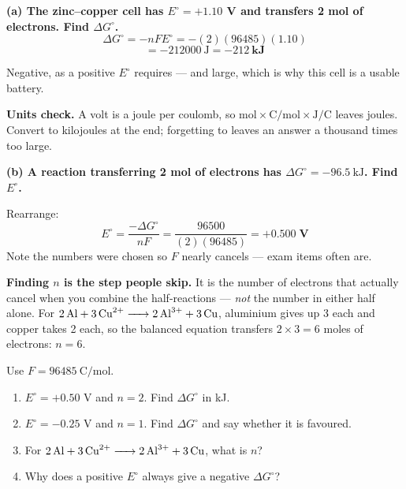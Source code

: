 \documentclass{apchem-worksheet}
\begin{document}
\begin{workedexample}
\textbf{(a) The zinc--copper cell has $E^{\circ} = +1.10$ V and
transfers 2 mol of electrons. Find $\Delta G^{\circ}$.}
\[ \Delta G^{\circ} = -nFE^{\circ}
   = -(2)(96485)(1.10) \]
\[ = \SI{-212000}{\joule} = \mathbf{\SI{-212}{\kilo\joule}} \]

Negative, as a positive $E^{\circ}$ requires --- and large, which is why
this cell is a usable battery.

\textbf{Units check.} A volt is a joule per coulomb, so
$\text{mol} \times \text{C/mol} \times \text{J/C}$ leaves joules.
Convert to kilojoules at the end; forgetting to leaves an answer a
thousand times too large.

\textbf{(b) A reaction transferring 2 mol of electrons has
$\Delta G^{\circ} = \SI{-96.5}{\kilo\joule}$. Find $E^{\circ}$.}

Rearrange:
\[ E^{\circ} = \frac{-\Delta G^{\circ}}{nF}
   = \frac{96500}{(2)(96485)}
   = \mathbf{+0.500\;\text{V}} \]
Note the numbers were chosen so $F$ nearly cancels --- exam items often
are.

\textbf{Finding $n$ is the step people skip.} It is the number of
electrons that actually cancel when you combine the half-reactions ---
\emph{not} the number in either half alone. For
$\ce{2Al + 3Cu^2+ -> 2Al^3+ + 3Cu}$, aluminium gives up 3 each and
copper takes 2 each, so the balanced equation transfers
$2 \times 3 = 6$ moles of electrons: $n = 6$.
\end{workedexample}

\begin{yourturn}
Use $F = \SI{96485}{\coulomb\per\mole}$.
\begin{enumerate}[leftmargin=*,itemsep=0.5em]
  \item $E^{\circ} = +0.50$ V and $n = 2$. Find $\Delta G^{\circ}$ in
        kJ. \workspace[2.0cm]
  \item $E^{\circ} = -0.25$ V and $n = 1$. Find $\Delta G^{\circ}$ and
        say whether it is favoured. \workspace[2.0cm]
  \item For $\ce{2Al + 3Cu^2+ -> 2Al^3+ + 3Cu}$, what is $n$?
        \workspace[1.6cm]
  \item Why does a positive $E^{\circ}$ always give a negative
        $\Delta G^{\circ}$? \workspace[1.6cm]
\end{enumerate}
\end{yourturn}
\end{document}
